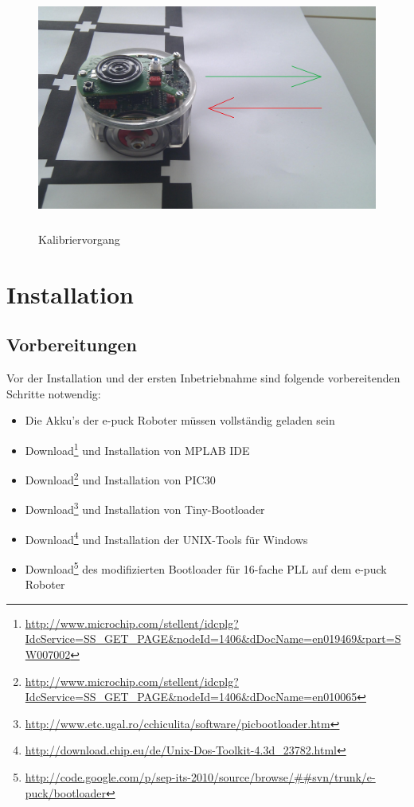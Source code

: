 \documentclass[10pt,a4paper]{article}
\let\oldsection\section
\renewcommand{\section}{\newpage \oldsection}
\begin{document}
		\vspace{30pt}
		 \begin{figure}[htbp]
			\includegraphics[height=8cm]{images/puck3klein} 
			\caption{Kalibriervorgang}
			\label{kalibrierabbildung}
		\end{figure}
\section{Installation}
			\subsection{Vorbereitungen} 
			Vor der Installation und der ersten Inbetriebnahme sind folgende vorbereitenden Schritte notwendig:
			\begin{itemize}
				\item{Die Akku's der e-puck Roboter m\"ussen vollst\"andig geladen sein}																																					
	            \item{Download\footnote[1]
	            {\url{http://www.microchip.com/stellent/idcplg?IdcService=SS_GET_PAGE&nodeId=1406&dDocName=en019469&part=SW007002}} 
				und Installation von MPLAB IDE}
				\item {Download\footnote[2]{\url{http://www.microchip.com/stellent/idcplg?IdcService=SS_GET_PAGE&nodeId=1406&dDocName=en010065}} und 
				Installation von PIC30}
				\item{Download\footnote[3]{\url{http://www.etc.ugal.ro/cchiculita/software/picbootloader.htm}} und Installation von Tiny-Bootloader}
				\item{Download\footnote[4]{\url{http://download.chip.eu/de/Unix-Dos-Toolkit-4.3d_23782.html}} und Installation der UNIX-Tools f\"ur Windows}
				\item{Download\footnote[5]{\url{http://code.google.com/p/sep-its-2010/source/browse/##svn/trunk/e-puck/bootloader}} des modifizierten Bootloader f\"ur 
				16-fache PLL auf dem e-puck Roboter}
			\end{itemize}
\end{document}
